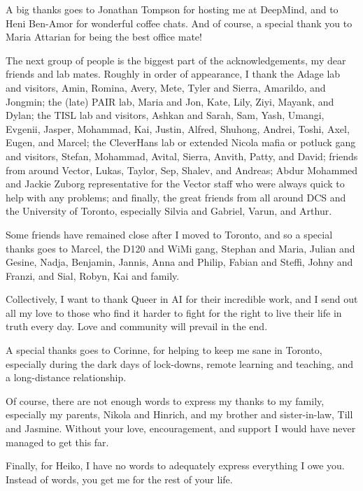 A big thanks goes to Jonathan Tompson for hosting me at DeepMind, and to Heni Ben-Amor for wonderful coffee chats.
And of course, a special thank you to Maria Attarian for being the best office mate!

The next group of people is the biggest part of the acknowledgements, my dear friends and lab mates.
Roughly in order of appearance, I thank
the Adage lab and visitors, Amin, Romina, Avery, Mete, Tyler and Sierra, Amarildo, and Jongmin; the (late) PAIR lab, Maria and Jon, Kate, Lily, Ziyi, Mayank, and Dylan; the TISL lab and visitors, Ashkan and Sarah, Sam, Yash, Umangi, Evgenii, Jasper, Mohammad, Kai, Justin, Alfred, Shuhong, Andrei, Toshi, Axel, Eugen, and Marcel; the CleverHans lab or extended Nicola mafia or potluck gang and visitors, Stefan, Mohammad, Avital, Sierra, Anvith, Patty, and David; friends from around Vector, Lukas, Taylor, Sep, Shalev, and Andreas; Abdur Mohammed and Jackie Zuborg representative for the Vector staff who were always quick to help with any problems; and finally, the great friends from all around DCS and the University of Toronto, especially Silvia and Gabriel, Varun, and Arthur.

Some friends have remained close after I moved to Toronto, and so a special thanks goes to Marcel, the D120 and WiMi gang, Stephan and Maria, Julian and Gesine, Nadja, Benjamin, Jannis, Anna and Philip, Fabian and Steffi, Johny and Franzi, and Sial, Robyn, Kai and family.

Collectively, I want to thank Queer in AI for their incredible work, and I send out all my love to those who find it harder to fight for the right to live their life in truth every day.
Love and community will prevail in the end.

A special thanks goes to Corinne, for helping to keep me sane in Toronto, especially during the dark days of lock-downs, remote learning and teaching, and a long-distance relationship.

Of course, there are not enough words to express my thanks to my family, especially my parents, Nikola and Hinrich, and my brother and sister-in-law, Till and Jasmine.
Without your love, encouragement, and support I would have never managed to get this far.

Finally, for Heiko, I have no words to adequately express everything I owe you.
Instead of words, you get me for the rest of your life.
